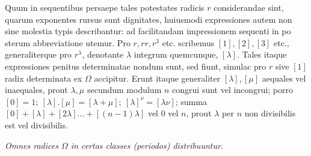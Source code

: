 Quum in sequentibus persaepe tales potestates radicis \(r\) considerandae sint, quarum exponentes rursus sunt dignitates, huiusmodi expressiones autem non sine molestia typis describantur: ad facilitandam impressionem sequenti in po%
sterum abbreviatione utemur. Pro \(r,\allowbreak rr,\allowbreak r^3\) etc. scribemus \([1],\allowbreak [2],\allowbreak [3]\) etc., generaliterque pro \(r^\lambda\), denotante \(\lambda\) integrum quemcunque, \([\lambda]\). Tales itaque expressiones penitus determinatae nondum sunt, sed fiunt, simulac pro \(r\) sive \([1]\) radix determinata ex \(\Omega\) accipitur. Erunt itaque generaliter \([\lambda],\allowbreak [\mu]\) aequales vel inaequales, prout \(\lambda,\allowbreak \mu\) secundum modulum \(n\) congrui sunt vel incongrui; porro \([0]=1;\allowbreak \ [\lambda].[\mu]=[\lambda+\mu];\allowbreak \ [\lambda]^\nu=[\lambda\nu]\); summa \([0]+[\lambda]+[2\lambda]\ldots+[(n-1)\lambda]\) vel \(0\) vel \(n\), prout \(\lambda\) per \(n\) non divisibilis est vel divisibilis.

\begin{center}\textit{Omnes radices \(\Omega\) in certas classes (periodos) distribuuntur.}\end{center}


